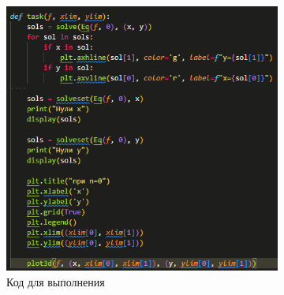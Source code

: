 \documentclass[14pt,a4paper]{extarticle}
\begin{document}
\begin{figure}
    [ht!]\centering
    \begin{subfigure}{0.48\linewidth}
        \includegraphics[width=0.95\linewidth]{figures/5.2/1.code.png}
        \caption{Код для выполнения}
        \label{pic:code}
    \end{subfigure}
    \begin{subfigure}{0.48\linewidth}

\end{subfigure}
\end{figure}
\end{document}
